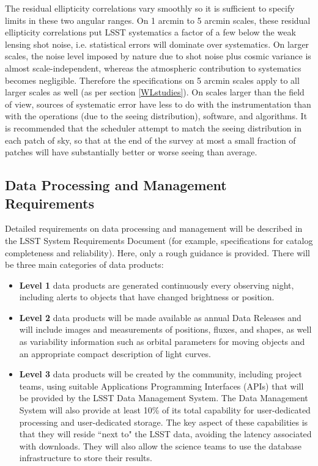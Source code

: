 The residual ellipticity correlations vary smoothly so it is sufficient to specify
limits in these two angular ranges. On 1 arcmin to 5 arcmin scales, these residual
ellipticity correlations put LSST systematics a factor of a few below the
weak lensing shot noise, i.e. statistical errors will dominate over systematics.
On larger scales, the noise level imposed by nature due to shot noise plus
cosmic variance is almost scale-independent, whereas the atmospheric
contribution to systematics becomes negligible.  Therefore the
specifications on 5 arcmin scales apply to all larger scales as well
(as per section \ref{WLstudies}).  On scales larger than the field of view, sources of
systematic error have less to do with the instrumentation than with the operations
(due to the seeing distribution), software, and algorithms.  It is recommended
that the scheduler attempt to match the seeing distribution in each
patch of sky, so that at the end of the survey at most a small fraction
of patches will have substantially better or worse seeing than average.



\subsection{Data Processing and Management Requirements}

Detailed requirements on data processing and management will be described
in the LSST System Requirements Document (for example, specifications for catalog completeness
and reliability). Here, only a rough guidance is provided. There will be three
main categories of data products:

\begin{itemize}
\item \textbf{Level 1} data products are generated continuously every observing night,
including alerts to objects that have changed brightness or position.
\item \textbf{Level 2} data products will be made available as annual Data Releases
and will include images and measurements of positions, fluxes, and shapes, as well
as variability information such as orbital parameters for moving objects and
an appropriate compact description of light curves.
\item \textbf{Level 3} data products will be created by the community, including project teams,
using suitable Applications Programming Interfaces (APIs) that will be provided
by the LSST Data Management System. The Data Management System will also provide
at least 10\% of its total capability for user-dedicated processing and user-dedicated storage.
The key aspect of these capabilities is that they will reside ``next to" the LSST data,
avoiding the latency associated with downloads. They will also allow the science
teams to use the database infrastructure to store their results.
\end{itemize}


